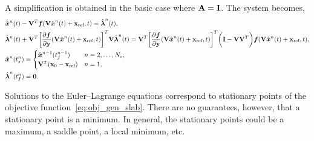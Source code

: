 A simplification is obtained in the basic case %
where $\mathbf{A} = \mathbf{I}$.
The system becomes,
\begin{align*}\label{eq:lspg_continuous_simle} & \dot{\hat{ \boldsymbol x}}^{n}(t)  -
\mathbf {V}^T  \boldsymbol f(\mathbf {V} \hat{ \boldsymbol x}^{n}(t) + \mathbf{x}_\text{ref},t) =  \hat{\boldsymbol \lambda}^{n}(t) , \\
 &\dot{\hat{\boldsymbol \lambda}}^{n}(t)   + \mathbf {V}^T \bigg[\frac{\partial
\boldsymbol f}{\partial \mathbf{y}}(\mathbf {V} \hat{ \boldsymbol x}^{n}(t) +
\mathbf{x}_\text{ref},t)\bigg]^T \mathbf {V} \hat{\boldsymbol \lambda}^{n}(t) = \mathbf {V}^T \bigg[
\frac{\partial \boldsymbol f}{\partial \mathbf{y}} (\mathbf {V} \hat{ \boldsymbol x}^{n}(t) +
\mathbf{x}_\text{ref},t) \bigg]^T \bigg( \mathbf{I} -   \mathbf {V} \mathbf {V}^T
\bigg)    \boldsymbol f(\mathbf {V} \hat{ \boldsymbol x}^{n}(t) + \mathbf{x}_\text{ref},t) , \\ & \hat{ \boldsymbol x}^{n}(t_s^{n}) =
\begin{cases} \hat{ \boldsymbol x}^{n-1}(t_f^{n-1}) & n=2,\ldots,N_s, \\
\mathbf {V}^T({{\mathbf{x}}_0} - \mathbf{x}_\text{ref}) & n=1, \end{cases}\\
&\hat{\boldsymbol \lambda}^{n}(t_f^{n}) = \boldsymbol 0 .  \end{align*}
\begin{remark}
Solutions to the Euler--Lagrange equations correspond to stationary points 
of the objective function~\eqref{eq:obj_gen_slab}. There are no guarantees, 
however, that a stationary point is a minimum. In general, the stationary 
points could be a maximum, a saddle point, a local minimum, etc.
\end{remark}

